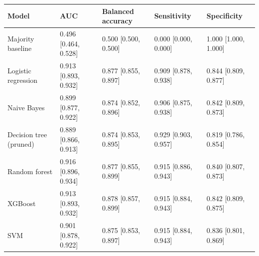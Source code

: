 \begin{tabular}{lllll}
\toprule
\textbf{Model} & \textbf{AUC} & \textbf{Balanced accuracy} & \textbf{Sensitivity} & \textbf{Specificity} \\
\midrule
Majority baseline & 0.496 [0.464, 0.528] & 0.500 [0.500, 0.500] & 0.000 [0.000, 0.000] & 1.000 [1.000, 1.000] \\
Logistic regression & 0.913 [0.893, 0.932] & 0.877 [0.855, 0.897] & 0.909 [0.878, 0.938] & 0.844 [0.809, 0.877] \\
Naive Bayes & 0.899 [0.877, 0.922] & 0.874 [0.852, 0.896] & 0.906 [0.875, 0.938] & 0.842 [0.809, 0.873] \\
Decision tree (pruned) & 0.889 [0.866, 0.913] & 0.874 [0.853, 0.895] & 0.929 [0.903, 0.957] & 0.819 [0.786, 0.854] \\
Random forest & 0.916 [0.896, 0.934] & 0.877 [0.855, 0.899] & 0.915 [0.886, 0.943] & 0.840 [0.807, 0.873] \\
XGBoost & 0.913 [0.893, 0.932] & 0.878 [0.857, 0.899] & 0.915 [0.884, 0.943] & 0.842 [0.809, 0.875] \\
SVM & 0.901 [0.878, 0.922] & 0.875 [0.853, 0.897] & 0.915 [0.884, 0.943] & 0.836 [0.801, 0.869] \\
\bottomrule
\end{tabular}
